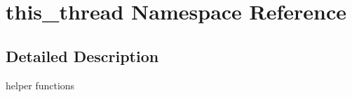 \hypertarget{namespacethis__thread}{}\section{this\+\_\+thread Namespace Reference}
\label{namespacethis__thread}


\subsection{Detailed Description}
helper functions 